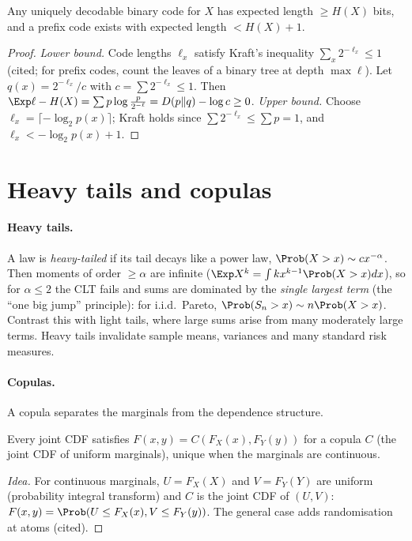 \begin{theorem}
Any uniquely decodable binary code for $X$ has expected length $\ge H(X)$ bits, and a prefix code exists with
expected length $<H(X)+1$.
\end{theorem}
\begin{proof}
\emph{Lower bound.} Code lengths $\ell_x$ satisfy Kraft's inequality $\sum_x2^{-\ell_x}\le1$ (cited; for prefix
codes, count the leaves of a binary tree at depth $\max\ell$). Let $q(x)=2^{-\ell_x}/c$ with
$c=\sum2^{-\ell_x}\le1$. Then
$\Exp\ell-H(X)=\sum p\log\frac{p}{2^{-\ell}}=D(p\Vert q)-\log c\ge0$.
\emph{Upper bound.} Choose $\ell_x=\lceil-\log_2p(x)\rceil$; Kraft holds since
$\sum2^{-\ell_x}\le\sum p=1$, and $\ell_x<-\log_2p(x)+1$.
\end{proof}

\section{Heavy tails and copulas}

\paragraph{Heavy tails.} A law is \emph{heavy-tailed} if its tail decays like a power law,
$\Prob(X>x)\sim cx^{-\alpha}$. Then moments of order $\ge\alpha$ are infinite
($\Exp X^k=\int kx^{k-1}\Prob(X>x)dx$), so for $\alpha\le2$ the CLT fails and sums are dominated by the
\emph{single largest term} (the ``one big jump'' principle): for i.i.d.\ Pareto, $\Prob(S_n>x)\sim n\Prob(X>x)$.
Contrast this with light tails, where large sums arise from many moderately large terms. Heavy tails invalidate
sample means, variances and many standard risk measures.

\paragraph{Copulas.} A copula separates the marginals from the dependence structure.

\begin{theorem}[Sklar]
Every joint CDF satisfies $F(x,y)=C(F_X(x),F_Y(y))$ for a copula $C$ (the joint CDF of uniform marginals),
unique when the marginals are continuous.
\end{theorem}
\begin{proof}[Idea]
For continuous marginals, $U=F_X(X)$ and $V=F_Y(Y)$ are uniform (probability integral transform) and
$C$ is the joint CDF of $(U,V)$: $F(x,y)=\Prob(U\le F_X(x),V\le F_Y(y))$. The general case adds
randomisation at atoms (cited).
\end{proof}

